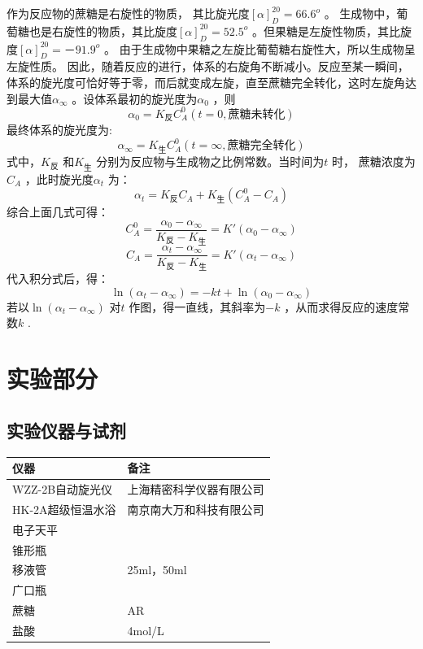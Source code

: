 \documentclass[11pt]{report}
\def \qCao {C_{A}^{0}}
\def \qCa {C_{A}}
\begin{document}
作为反应物的蔗糖是右旋性的物质，
其比旋光度\([\alpha]_{D}^{20}=66.6^{o}\) 。
生成物中，葡萄糖也是右旋性的物质，其比旋度\([\alpha]_{D}^{20}=52.5^{o}\) 。但果糖是左旋性物质，其比旋度\([\alpha]_{D}^{20}=－91.9^{o}\) 。
由于生成物中果糖之左旋比葡萄糖右旋性大，所以生成物呈左旋性质。
因此，随着反应的进行，体系的右旋角不断减小。反应至某一瞬间，体系的旋光度可恰好等于零，而后就变成左旋，直至蔗糖完全转化，这时左旋角达到最大值\(\alpha_{\infty}\) 。设体系最初的旋光度为\(\alpha_{0}\) ，则
\[
\alpha_{0}=K_{反}\qCao (t=0,蔗糖未转化)
\]
最终体系的旋光度为:
\[
\alpha_{\infty}=K_{生}\qCao (t=\infty,蔗糖完全转化)
\]
式中，\(K_{反}\) 和\(K_{生}\) 分别为反应物与生成物之比例常数。当时间为\(t\) 时，
蔗糖浓度为\(\qCa\) ，此时旋光度\(\alpha_{t}\) 为：
\[
\alpha_{t}=K_{反}\qCa+K_{生}(\qCao-\qCa)
\]
综合上面几式可得：
\[
\qCao=\frac{\alpha_{0}-\alpha_{\infty}}{K_{反}-K_{生}}=K'(\alpha_{0}-\alpha_{\infty})
\]
\[
\qCa=\frac{\alpha_{t}-\alpha_{\infty}}{K_{反}-K_{生}}=K'(\alpha_{t}-\alpha_{\infty})
\]
代入积分式后，得：
\[
\ln(\alpha_{t}-\alpha_{\infty})=-kt+\ln(\alpha_{0}-\alpha_{\infty})
\]
若以\(\ln(\alpha_{t}-\alpha_{\infty})\) 对\(t\) 作图，得一直线，其斜率为\(-k\) ，从而求得反应的速度常数\(k\) .

\part{实验部分}
\label{sec:org27f19fc}
\chapter{实验仪器与试剂}
\label{sec:org7ab145e}
\begin{center}
\begin{tabular}{ll}
仪器 & 备注\\
\hline
WZZ-2B自动旋光仪 & 上海精密科学仪器有限公司\\
HK-2A超级恒温水浴 & 南京南大万和科技有限公司\\
电子天平 & \\
锥形瓶 & \\
移液管 & 25ml，50ml\\
广口瓶 & \\
蔗糖 & AR\\
盐酸 & 4mol/L\\
\end{tabular}
\end{center}
\end{document}
